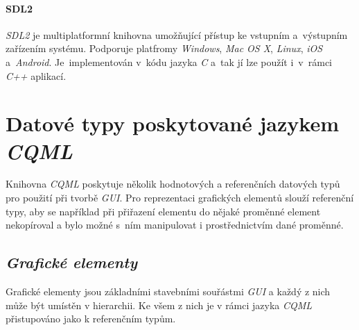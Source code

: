 \documentclass[11pt,twoside,a4paper]{book}
\begin{document}
\subsubsection{SDL2}
\textit{SDL2} je multiplatformní knihovna umožňující přístup ke vstupním a~výstupním zařízením systému. Podporuje platfromy \textit{Windows}, \textit{Mac OS X}, \textit{Linux}, \textit{iOS} a~\textit{Android}. Je~implementován v~kódu jazyka \textit{C} a~tak jí lze použít i~v~rámci \textit{C++} aplikací.

\chapter[Datové typy \textit{CQML}]{\label{CH:APC}Datové typy poskytované jazykem \textit{CQML}}
Knihovna \textit{CQML} poskytuje několik hodnotových a referenčních datových typů pro použití při tvorbě \textit{GUI}. Pro reprezentaci grafických elementů slouží referenční typy, aby se například při přiřazení elementu do nějaké proměnné element nekopíroval a bylo možné s~ním manipulovat i prostřednictvím dané proměnné.
\section{\textit{Grafické elementy}}
Grafické elementy jsou základními stavebními souřástmi \textit{GUI} a každý z nich může být umístěn v hierarchii. Ke všem z nich je v rámci jazyka \textit{CQML} přistupováno jako k referenčním typům.
\end{document}
